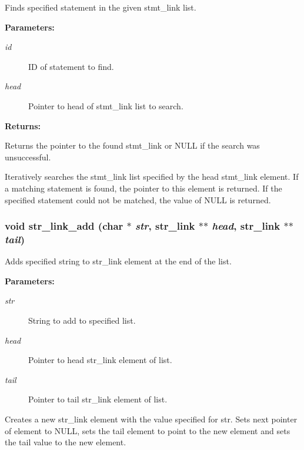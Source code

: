 Finds specified statement in the given stmt\_\-link list.

\begin{Desc}
\item[{\bf Parameters: }]\par
\begin{description}
\item[
{\em id}]ID of statement to find. \item[
{\em head}]Pointer to head of stmt\_\-link list to search.

\end{description}
\end{Desc}
\begin{Desc}
\item[{\bf Returns: }]\par
Returns the pointer to the found stmt\_\-link or NULL if the search was unsuccessful.

\end{Desc}
Iteratively searches the stmt\_\-link list specified by the head stmt\_\-link element. If a matching statement is found, the pointer to this element is returned. If the specified statement could not be matched, the value of NULL is returned. 
\subsubsection{\setlength{\rightskip}{0pt plus 5cm}void str\_\-link\_\-add (char $\ast$ {\em str}, {\bf str\_\-link} $\ast$$\ast$ {\em head}, {\bf str\_\-link} $\ast$$\ast$ {\em tail})}\label{link_8h_a0}


Adds specified string to str\_\-link element at the end of the list.

\begin{Desc}
\item[{\bf Parameters: }]\par
\begin{description}
\item[
{\em str}]String to add to specified list. \item[
{\em head}]Pointer to head str\_\-link element of list. \item[
{\em tail}]Pointer to tail str\_\-link element of list.

\end{description}
\end{Desc}
Creates a new str\_\-link element with the value specified for str. Sets next pointer of element to NULL, sets the tail element to point to the new element and sets the tail value to the new element. 

